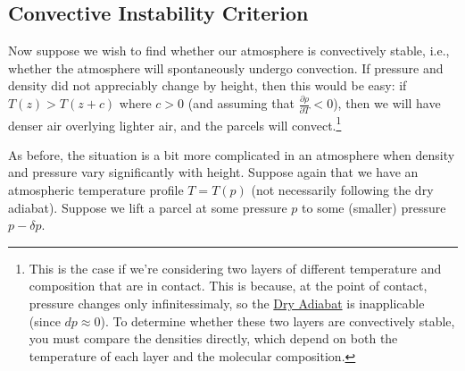 \subsection{Convective Instability Criterion}

Now suppose we wish to find whether our atmosphere is convectively stable, i.e., whether the atmosphere will spontaneously undergo convection. If pressure and density did not appreciably change by height, then this would be easy: if $T(z)>T(z+c)$ where $c>0$ (and assuming that $\frac{\partial \rho}{\partial T}<0$), then we will have denser air overlying lighter air, and the parcels will convect.\footnote{
    This is the case if we're considering two layers of different temperature and composition that are in contact. This is because, at the point of contact, pressure changes only infinitessimaly, so the \hyperref[Dry Adiabat]{Dry Adiabat} is inapplicable (since $dp\approx0$). To determine whether these two layers are convectively stable, you must compare the densities directly, which depend on both the temperature of each layer and the molecular composition.
}

As before, the situation is a bit more complicated in an atmosphere when density and pressure vary significantly with height. Suppose again that we have an atmospheric temperature profile $T=T(p)$ (not necessarily following the dry adiabat). Suppose we lift a parcel at some pressure $p$ to some (smaller) pressure $p-\delta p$.


